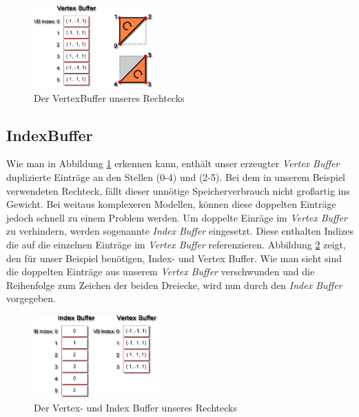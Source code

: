 \begin{Spacing}{\mylinespace}
\begin{figure}[h!]
	\vspace*{15px}
	\centering
	\includegraphics[height=120px]{graphics/vertexbuffer2.png}	
	\caption{Der VertexBuffer unseres Rechtecks}
	\label{fig:VertexBuffer}
\end{figure}

\subsection{IndexBuffer}
Wie man in Abbildung \ref{fig:VertexBuffer} erkennen kann, enthält unser erzeugter \textit{Vertex Buffer} duplizierte Einträge an den Stellen (0-4) und (2-5). Bei dem in unserem Beispiel verwendeten Rechteck, fällt dieser unnötige Speicherverbrauch nicht großartig ins Gewicht. Bei weitaus komplexeren Modellen, können diese doppelten Einträge jedoch schnell zu einem Problem werden. Um doppelte Einräge im \textit{Vertex Buffer} zu verhindern, werden sogenannte \textit{Index Buffer} eingesetzt. Diese enthalten Indizes die auf die einzelnen Einträge im \textit{Vertex Buffer} referenzieren. Abbildung \ref{fig:IndexBuffer} zeigt, den für unser Beispiel benötigen, Index- und Vertex Buffer. Wie man sieht sind die doppelten Einträge aus unserem \textit{Vertex Buffer} verschwunden und die Reihenfolge zum Zeichen der beiden Dreiecke, wird nun durch den \textit{Index Buffer} vorgegeben. 
 

\begin{figure}[h!]
	\vspace*{15px}
	\centering
	\includegraphics[height=120px]{graphics/indexbuffer2.png}	
	\caption{Der Vertex- und Index Buffer unseres Rechtecks}
	\label{fig:IndexBuffer}
\end{figure}


\end{Spacing}
